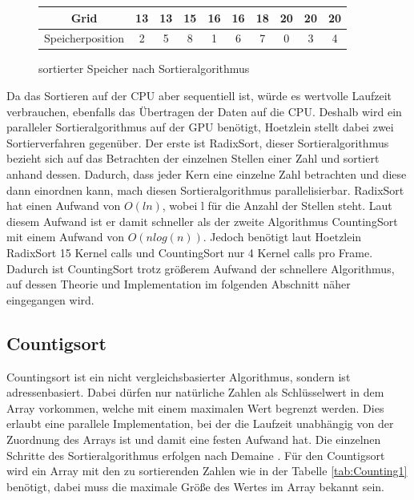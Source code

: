 \documentclass[intern,palatino]{cgBA}
\begin{document}
\begin{figure}[H]
	\centering
	\begin{tabular}{ | c || c | c | c | c | c | c | c | c | c |}
		\hline
		Grid 				&  13 & 13 & 15 & 16 & 16 & 18 & 20 & 20 & 20	\\ \hline
		Speicherposition	&   2 &  5 &  8 &  1 &  6 &  7 &  0 &  3 &  4	\\
		\hline
	\end{tabular}
	\caption{sortierter Speicher nach Sortieralgorithmus}
	\label{tab:Speichersorted}
\end{figure}

Da das Sortieren auf der CPU aber sequentiell ist, würde es wertvolle Laufzeit verbrauchen, ebenfalls das Übertragen der Daten auf die CPU. Deshalb wird ein paralleler Sortieralgorithmus auf der GPU benötigt, Hoetzlein \cite{nvidia} stellt dabei zwei Sortierverfahren gegenüber. Der erste ist RadixSort, dieser Sortieralgorithmus bezieht sich auf das Betrachten der einzelnen Stellen einer Zahl und sortiert anhand dessen. Dadurch, dass jeder Kern eine einzelne Zahl betrachten und diese dann einordnen kann, mach diesen Sortieralgorithmus parallelisierbar.
RadixSort hat einen Aufwand von $O(l n)$, wobei l für die Anzahl der Stellen steht. Laut diesem Aufwand ist er damit schneller als der zweite Algorithmus CountingSort mit einem Aufwand von $O(n log(n))$. Jedoch benötigt laut Hoetzlein \cite{nvidia} RadixSort 15 Kernel calls und CountingSort nur 4 Kernel calls pro Frame. Dadurch ist CountingSort trotz größerem Aufwand der schnellere Algorithmus, auf dessen Theorie und Implementation im folgenden Abschnitt näher eingegangen wird.


\subsection{Countigsort}\label{counting}
Countingsort ist ein nicht vergleichsbasierter Algorithmus, sondern ist adressenbasiert. Dabei dürfen nur natürliche Zahlen als Schlüsselwert in dem Array vorkommen, welche mit einem maximalen Wert begrenzt werden.
Dies erlaubt eine parallele Implementation, bei der die Laufzeit unabhängig von der Zuordnung des Arrays ist und damit eine festen Aufwand hat.
Die einzelnen Schritte des Sortieralgorithmus erfolgen nach Demaine \cite{counting}.
\newline
Für den Countigsort wird ein Array mit den zu sortierenden Zahlen wie in der Tabelle \ref{tab:Counting1} benötigt, dabei muss die maximale Größe des Wertes im Array bekannt sein.
\newline
\end{document}

